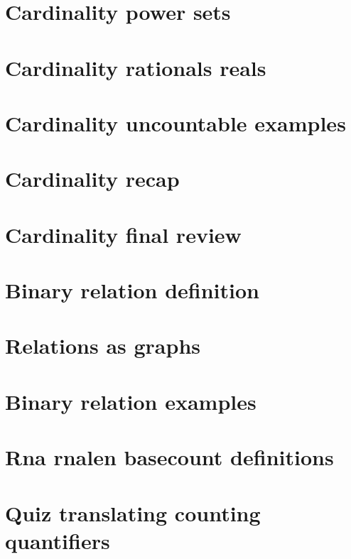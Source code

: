\section*{Cardinality power sets}

\vfill
\section*{Cardinality rationals reals}

\vfill
\section*{Cardinality uncountable examples}

\vfill
\section*{Cardinality recap}

\vfill
\section*{Cardinality final review}

\vfill
\section*{Binary relation definition}

\vfill
\section*{Relations as graphs}

\vfill
\section*{Binary relation examples}

\vfill
\section*{Rna rnalen basecount definitions}

\vfill
\section*{Quiz translating counting quantifiers}

\vfill
